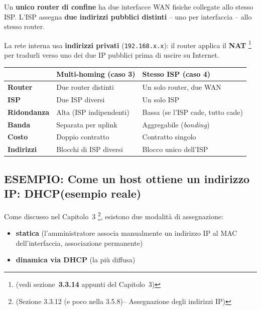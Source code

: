 \documentclass[a4paper,12pt]{report}
\begin{document}
Un \textbf{unico router di confine} ha due interfacce
WAN fisiche collegate allo stesso ISP. L'ISP assegna
\textbf{due indirizzi pubblici distinti} -- uno per
interfaccia -- allo stesso router.

La rete interna usa \textbf{indirizzi privati}
(\texttt{192.168.x.x}): il router applica il \textbf{NAT}
\footnote{(vedi sezione \textbf{\,3.3.14} 
appunti del Capitolo~3)} per tradurli verso uno dei
due IP pubblici prima di uscire su Internet.

\begin{center}
\begin{tabular}{lll}
\toprule
& \textbf{Multi-homing (caso 3)}
& \textbf{Stesso ISP (caso 4)} \\
\midrule
\textbf{Router}    & Due router distinti
                   & Un solo router, due WAN \\
\textbf{ISP}       & Due ISP diversi
                   & Un solo ISP \\
\textbf{Ridondanza}& Alta (ISP indipendenti)
                   & Bassa (se l'ISP cade, tutto cade) \\
\textbf{Banda}     & Separata per uplink
                   & Aggregabile (\textit{bonding}) \\
\textbf{Costo}     & Doppio contratto
                   & Contratto singolo \\
\textbf{Indirizzi} & Blocchi di ISP diversi
                   & Blocco unico dell'ISP \\
\bottomrule
\end{tabular}
\end{center}







\newpage

\subsection{ESEMPIO: Come un host ottiene un indirizzo IP: DHCP(esempio reale)}

Come discusso nel Capitolo~3 \footnote{(Sezione 3.3.12 (e poco nella 3.5.8)-- Assegnazione degli
indirizzi IP)}, esistono due modalità di assegnazione: 
\begin{itemize}
    \item 
\textbf{statica}
(l'amministratore associa manualmente un indirizzo IP al MAC
dell'interfaccia, associazione permanente)
\item   \textbf{dinamica via DHCP}
(la più diffusa)
\end{itemize} 
\end{document}
